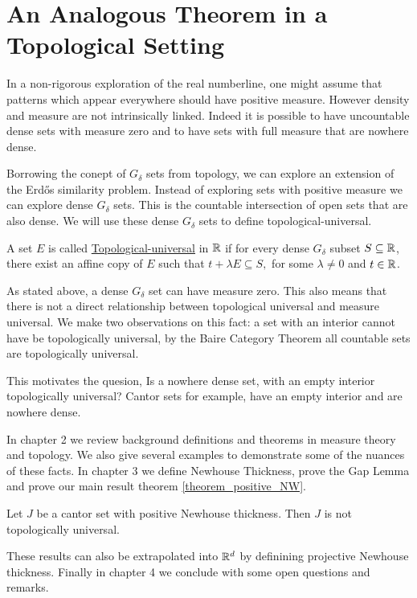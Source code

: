 \section{An Analogous Theorem in a Topological Setting}

In a non-rigorous exploration of the real numberline, one might assume that patterns which appear everywhere should have positive measure.  However density and measure are not intrinsically linked.  Indeed it is possible to have uncountable dense sets with measure zero and to have sets with full measure that are nowhere dense.  

Borrowing the conept of $G_\delta$ sets from topology, we can explore an extension of the Erd\H{o}s similarity problem.  Instead of exploring sets with positive measure we can explore dense $G_\delta$ sets.  This is the countable intersection of open sets that are also dense.  We will use these dense $G_\delta$ sets to define topological-universal. 

\begin{definition}
    A set $E$ is called \underline{Topological-universal} in $\mathbb{R}$ if for every dense $G_\delta$ subset $S \subseteq \mathbb{R}$, there exist an affine copy of $E$ such that $t+\lambda E \subseteq S,$ for some $\lambda \neq 0$ and $t \in \mathbb{R}$.  
\end{definition}

As stated above, a dense $G_\delta$ set can have measure zero.  This also means that there is not a direct relationship between topological universal and measure universal.  We make two observations on this fact: a set with an interior cannot have be topologically universal, by the Baire Category Theorem all countable sets are topologically universal.   

This motivates the quesion, Is a nowhere dense set, with an empty interior topologically universal?  Cantor sets for example, have an empty interior and are nowhere dense.  

In chapter 2 we review background definitions and theorems in measure theory and topology.  We also give several examples to demonstrate some of the nuances of these facts.  In chapter 3 we define Newhouse Thickness, prove the Gap Lemma and prove our main result theorem \ref{theorem_positive_NW}.

\begin{theorem*}
Let $J$ be a cantor set with positive Newhouse thickness.  Then $J$ is not topologically universal.
\end{theorem*}

These results can also be extrapolated into $\mathbb{R}^d$ by definining projective Newhouse thickness.  Finally in chapter 4 we conclude with some open questions and remarks.  


